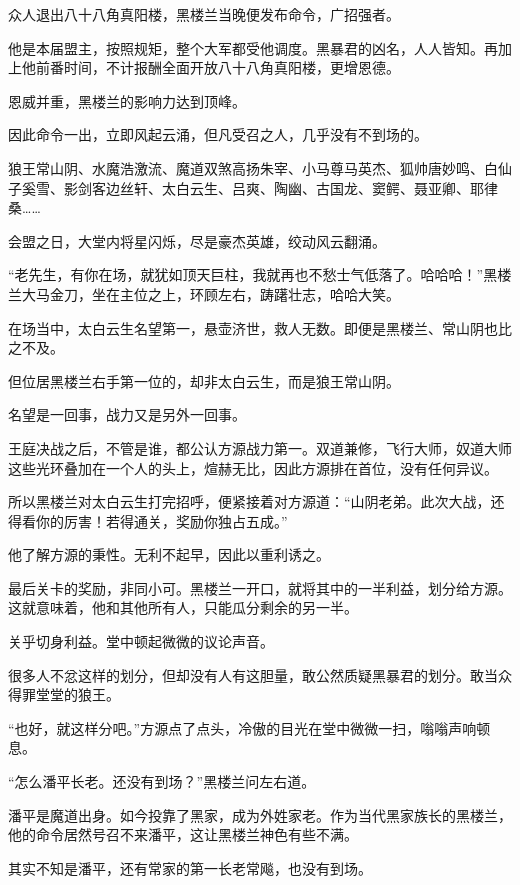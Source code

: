 
\begin{this_body}

众人退出八十八角真阳楼，黑楼兰当晚便发布命令，广招强者。

他是本届盟主，按照规矩，整个大军都受他调度。黑暴君的凶名，人人皆知。再加上他前番时间，不计报酬全面开放八十八角真阳楼，更增恩德。

恩威并重，黑楼兰的影响力达到顶峰。

因此命令一出，立即风起云涌，但凡受召之人，几乎没有不到场的。

狼王常山阴、水魔浩激流、魔道双煞高扬朱宰、小马尊马英杰、狐帅唐妙鸣、白仙子奚雪、影剑客边丝轩、太白云生、吕爽、陶幽、古国龙、窦鳄、聂亚卿、耶律桑……

会盟之日，大堂内将星闪烁，尽是豪杰英雄，绞动风云翻涌。

“老先生，有你在场，就犹如顶天巨柱，我就再也不愁士气低落了。哈哈哈！”黑楼兰大马金刀，坐在主位之上，环顾左右，踌躇壮志，哈哈大笑。

在场当中，太白云生名望第一，悬壶济世，救人无数。即便是黑楼兰、常山阴也比之不及。

但位居黑楼兰右手第一位的，却非太白云生，而是狼王常山阴。

名望是一回事，战力又是另外一回事。

王庭决战之后，不管是谁，都公认方源战力第一。双道兼修，飞行大师，奴道大师这些光环叠加在一个人的头上，煊赫无比，因此方源排在首位，没有任何异议。

所以黑楼兰对太白云生打完招呼，便紧接着对方源道：“山阴老弟。此次大战，还得看你的厉害！若得通关，奖励你独占五成。”

他了解方源的秉性。无利不起早，因此以重利诱之。

最后关卡的奖励，非同小可。黑楼兰一开口，就将其中的一半利益，划分给方源。这就意味着，他和其他所有人，只能瓜分剩余的另一半。

关乎切身利益。堂中顿起微微的议论声音。

很多人不忿这样的划分，但却没有人有这胆量，敢公然质疑黑暴君的划分。敢当众得罪堂堂的狼王。

“也好，就这样分吧。”方源点了点头，冷傲的目光在堂中微微一扫，嗡嗡声响顿息。

“怎么潘平长老。还没有到场？”黑楼兰问左右道。

潘平是魔道出身。如今投靠了黑家，成为外姓家老。作为当代黑家族长的黑楼兰，他的命令居然号召不来潘平，这让黑楼兰神色有些不满。

其实不知是潘平，还有常家的第一长老常飚，也没有到场。


\end{this_body}
